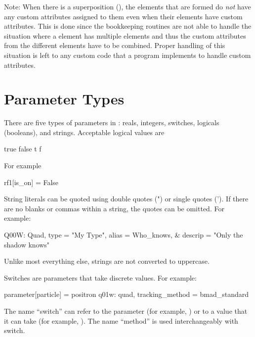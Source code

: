 {{{Note: When there is a superposition (), the  elements that are formed
do {\em not} have any custom attributes assigned to them even when their  elements
have custom attributes. This is done since the \bmad bookkeeping routines are not able to handle the
situation where a  element has multiple  elements and thus the custom
attributes from the different  elements have to be combined. Proper handling of this
situation is left to any custom code that a program implements to handle custom attributes.

\section{Parameter Types}
\label{s:param.types}

There are five types of parameters in \bmad: reals, integers, switches, logicals (booleans), and
strings. Acceptable logical values are
\begin{example}
   true    false
   t       f
\end{example}
For example
\begin{example}
  rf1[is_on] = False
\end{example}

String literals can be quoted using double quotes (") or single quotes (').  If there are no blanks
or commas within a string, the quotes can be omitted. For example:
\begin{example}
  Q00W: Quad, type = "My Type", alias = Who_knows, &
                                  descrip = "Only the shadow knows"
\end{example}
Unlike most everything else, strings are not converted to uppercase.

Switches are parameters that take discrete values. For example:
\begin{example}
  parameter[particle] = positron          
  q01w: quad, tracking_method = bmad_standard 
\end{example}
The name ``switch'' can refer to the parameter (for example, ) or to a value
that it can take (for example, ). The name ``method'' is used interchangeably with
switch.

}}}
